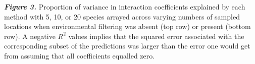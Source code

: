 \documentclass[12pt,]{article}
\begin{document}
\begin{spacing}{1.9}
\begin{flushleft}
\textbf{\emph{Figure 3.}} Proportion of variance in interaction
coefficients explained by each method with 5, 10, or 20 species arrayed
across varying numbers of sampled locations when environmental filtering
was absent (top row) or present (bottom row). A negative \(R^2\) values
implies that the squared error associated with the corresponding subset
of the predictions was larger than the error one would get from assuming
that all coefficients equalled zero.

\end{flushleft}
\end{spacing}
\end{document}
